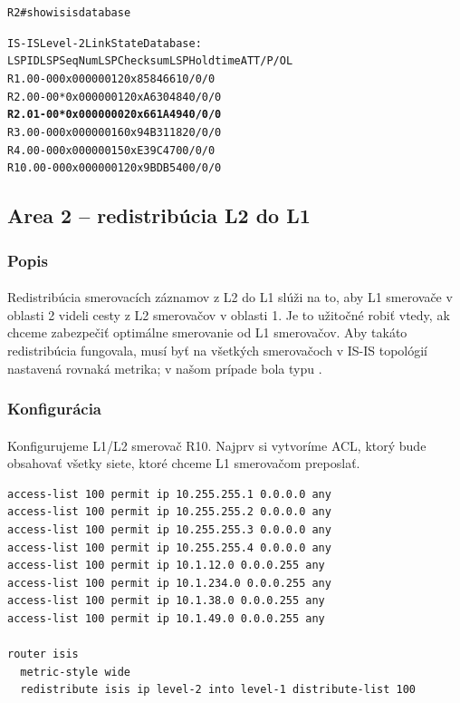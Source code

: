 \documentclass[12pt,twoside,a4paper]{report}
\begin{document}
\noindent
{\selectfont
\begin{small}
\begin{alltt}
R2#show isis database

IS-IS Level-2 Link State Database:
LSPID                 LSP Seq Num  LSP Checksum  LSP Holdtime      ATT/P/OL
R1.00-00              0x00000012   0x8584        661               0/0/0
R2.00-00            * 0x00000012   0xA630        484               0/0/0
\textbf{R2.01-00            * 0x00000002   0x661A        494               0/0/0}
R3.00-00              0x00000016   0x94B3        1182              0/0/0
R4.00-00              0x00000015   0xE39C        470               0/0/0
R10.00-00             0x00000012   0x9BDB        540               0/0/0
\end{alltt}
\end{small}
}






\subsection{Area 2 – redistribúcia L2 do L1}
\subsubsection{Popis}
\paragraph{}
Redistribúcia smerovacích záznamov z L2 do L1 slúži na to, aby L1 smerovače v oblasti 2 videli cesty z L2 smerovačov v oblasti 1. Je to užitočné  robiť vtedy, ak chceme zabezpečiť optimálne smerovanie od L1 smerovačov. Aby takáto redistribúcia fungovala, musí byť na všetkých smerovačoch v IS-IS topológií nastavená rovnaká metrika; v našom prípade bola typu .

\subsubsection{Konfigurácia}
\paragraph{}
Konfigurujeme L1/L2 smerovač R10. Najprv si vytvoríme ACL, ktorý bude obsahovať všetky siete, ktoré chceme L1 smerovačom preposlať.

\noindent
{\selectfont
\begin{small}
\begin{verbatim}
access-list 100 permit ip 10.255.255.1 0.0.0.0 any
access-list 100 permit ip 10.255.255.2 0.0.0.0 any
access-list 100 permit ip 10.255.255.3 0.0.0.0 any
access-list 100 permit ip 10.255.255.4 0.0.0.0 any
access-list 100 permit ip 10.1.12.0 0.0.0.255 any
access-list 100 permit ip 10.1.234.0 0.0.0.255 any
access-list 100 permit ip 10.1.38.0 0.0.0.255 any
access-list 100 permit ip 10.1.49.0 0.0.0.255 any

router isis
  metric-style wide
  redistribute isis ip level-2 into level-1 distribute-list 100
\end{verbatim}
\end{small}
}
\end{document}
